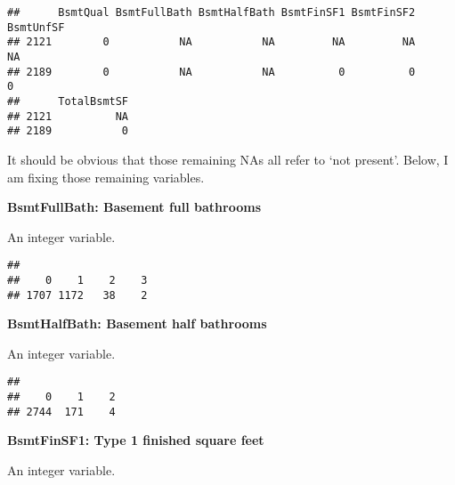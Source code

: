 \documentclass[]{article}
\newenvironment{Shaded}{\begin{snugshade}}{\end{snugshade}}
\newcommand{\KeywordTok}[1]{\textcolor[rgb]{0.13,0.29,0.53}{\textbf{#1}}}
\newcommand{\DecValTok}[1]{\textcolor[rgb]{0.00,0.00,0.81}{#1}}
\newcommand{\OperatorTok}[1]{\textcolor[rgb]{0.81,0.36,0.00}{\textbf{#1}}}
\newcommand{\NormalTok}[1]{#1}
\begin{document}
\begin{verbatim}
##      BsmtQual BsmtFullBath BsmtHalfBath BsmtFinSF1 BsmtFinSF2 BsmtUnfSF
## 2121        0           NA           NA         NA         NA        NA
## 2189        0           NA           NA          0          0         0
##      TotalBsmtSF
## 2121          NA
## 2189           0
\end{verbatim}

It should be obvious that those remaining NAs all refer to `not
present'. Below, I am fixing those remaining variables.

\textbf{BsmtFullBath: Basement full bathrooms}

An integer variable.

\begin{Shaded}
\end{Shaded}

\begin{verbatim}
## 
##    0    1    2    3 
## 1707 1172   38    2
\end{verbatim}

\textbf{BsmtHalfBath: Basement half bathrooms}

An integer variable.

\begin{Shaded}
\end{Shaded}

\begin{verbatim}
## 
##    0    1    2 
## 2744  171    4
\end{verbatim}

\textbf{BsmtFinSF1: Type 1 finished square feet}

An integer variable.

\begin{Shaded}
\end{Shaded}
\end{document}
